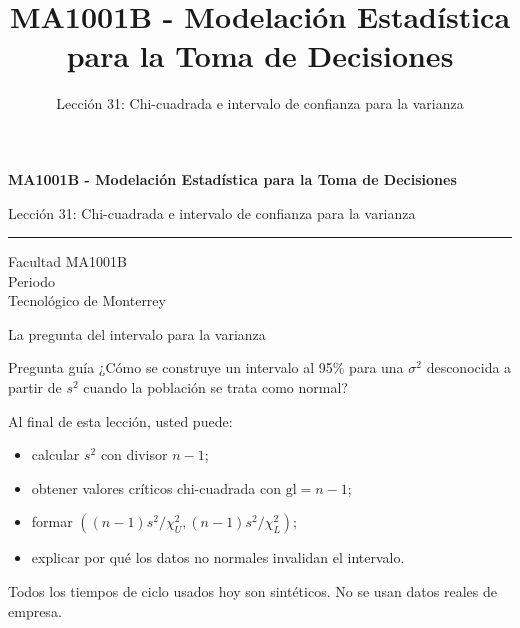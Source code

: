 \documentclass[aspectratio=169,10pt,spanish]{beamer}
\title{MA1001B - Modelación Estadística para la Toma de Decisiones}
\subtitle{Lección 31: Chi-cuadrada e intervalo de confianza para la varianza}
\author{}
\institute{Tecnol\'ogico de Monterrey}
\date{}
\begin{document}
\begin{frame}[plain]
  \vspace{1.2cm}
  {\Large\bfseries MA1001B - Modelación Estadística para la Toma de Decisiones\par}
  \vspace{0.7cm}
  {\large Lección 31: Chi-cuadrada e intervalo de confianza para la varianza\par}
  \vspace{0.7cm}
  {\color{TecRojo}\rule{\textwidth}{1.2pt}}
  \vspace{0.8cm}

  Facultad MA1001B\\[0.3cm]
  Periodo\\[0.3cm]
  Tecnol\'ogico de Monterrey
\end{frame}

\begin{frame}{La pregunta del intervalo para la varianza}
  \begin{alertblock}{Pregunta guía}
    ¿Cómo se construye un intervalo al 95\% para una $\sigma^{2}$ desconocida
    a partir de $s^{2}$ cuando la población se trata como normal?
  \end{alertblock}

  \vspace{0.6em}
  Al final de esta lección, usted puede:
  \begin{itemize}
    \item calcular $s^{2}$ con divisor $n-1$;
    \item obtener valores críticos chi-cuadrada con $\mathrm{gl}=n-1$;
    \item formar $((n-1)s^{2}/\chi^{2}_{U},(n-1)s^{2}/\chi^{2}_{L})$;
    \item explicar por qué los datos no normales invalidan el intervalo.
  \end{itemize}

  \vfill
  \scriptsize Todos los tiempos de ciclo usados hoy son sintéticos. No se usan datos reales de empresa.
\end{frame}
\end{document}
